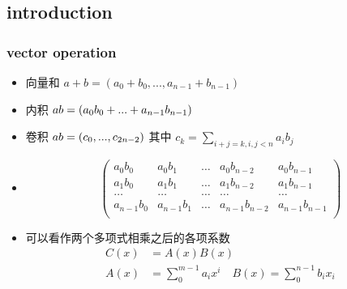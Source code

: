 \documentclass[cjk]{beamer}
\begin{document}
\begin{CJK*}{UTF8}{gbsn}
  \subsection{introduction}
    \begin{frame}
      \frametitle{vector operation}
      \begin{itemize}
        \item 向量和 $a + b = (a_0 + b_0,..., a_{n - 1} + b_{n - 1})$
        \item 内积   $a \* b = (a_0b_0 + ... + a_{n - 1}b_{n - 1})$
        \item 卷积
        $a \* b = (c_0, ..., c_{2n - 2})$ 其中 $c_k = \sum\limits_{i + j = k, i, j < n} a_ib_j$
        \item
        \begin{equation*}
          \left(
          \begin{array}{ccccc}
            a_0b_0 & a_0b_1 & \dots & a_0b_{n - 2} & a_0b_{n - 1} \\
            a_1b_0 & a_1b_1 & \dots & a_1b_{n - 2} & a_1b_{n - 1} \\
            \dots & \dots & \dots & \dots & \dots \\
            a_{n - 1}b_0 & a_{n - 1}b_1 & \dots & a_{n - 1}b_{n - 2} & a_{n - 1}b_{n - 1} \\
          \end{array}
          \right)
        \end{equation*}
      \item 可以看作两个多项式相乘之后的各项系数
        \begin{equation*}
          \begin{split}
          C(x) &= A(x)B(x) \\
          A(x) &= \sum_0^{m - 1}a_ix^i \quad B(x) = \sum_0^{n - 1}b_ix_i
        \end{split}
        \end{equation*}
      \end{itemize}
    \end{frame}


\end{CJK*}
\end{document}
